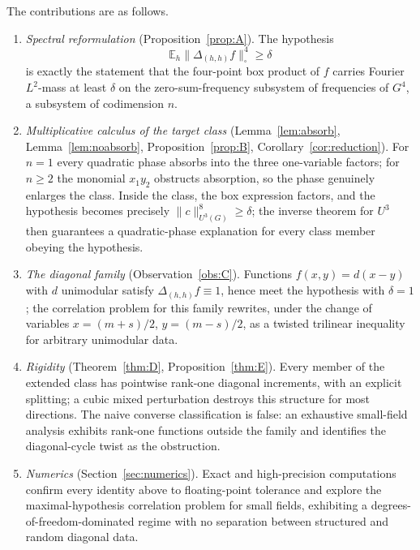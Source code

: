 \documentclass[11pt]{article}
\theoremstyle{remark}
\begin{document}
The contributions are as follows.
\begin{enumerate}
\item \emph{Spectral reformulation}
(Proposition~\ref{prop:A}). The hypothesis
\[
\mathbb{E}_h\|\Delta_{(h,h)}f\|_\square^4\ge\delta
\]
is exactly the statement
that the four-point box product of $f$ carries Fourier $L^2$-mass at least
$\delta$ on the zero-sum-frequency subsystem of frequencies of $G^4$, a
subsystem of codimension $n$.
\item \emph{Multiplicative calculus of the target class}
(Lemma~\ref{lem:absorb}, Lemma~\ref{lem:noabsorb},
Proposition~\ref{prop:B}, Corollary~\ref{cor:reduction}). For $n=1$ every
quadratic phase absorbs into the three one-variable factors; for $n\ge2$ the
monomial $x_1y_2$ obstructs absorption, so the phase genuinely enlarges the
class. Inside the class, the box expression factors, and the hypothesis
becomes precisely $\|c\|_{U^3(G)}^8\ge\delta$; the inverse theorem for
$U^3$ then guarantees a quadratic-phase explanation for every class member
obeying the hypothesis.
\item \emph{The diagonal family} (Observation~\ref{obs:C}). Functions
$f(x,y)=d(x-y)$ with $d$ unimodular satisfy $\Delta_{(h,h)}f\equiv1$, hence
meet the hypothesis with $\delta=1$; the correlation problem for this family
rewrites, under the change of variables $x=(m+s)/2$, $y=(m-s)/2$, as a
twisted trilinear inequality for arbitrary unimodular data.
\item \emph{Rigidity} (Theorem~\ref{thm:D}, Proposition~\ref{thm:E}). Every
member of the extended class has pointwise rank-one diagonal increments,
with an explicit splitting; a cubic mixed perturbation destroys this
structure for most directions. The naive converse classification is false:
an exhaustive small-field analysis exhibits rank-one functions outside the
family and identifies the diagonal-cycle twist as the obstruction.
\item \emph{Numerics} (Section~\ref{sec:numerics}). Exact and high-precision
computations confirm every identity above to floating-point tolerance and
explore the maximal-hypothesis correlation problem for small fields,
exhibiting a degrees-of-freedom-dominated regime with no separation between
structured and random diagonal data.
\end{enumerate}
\end{document}
